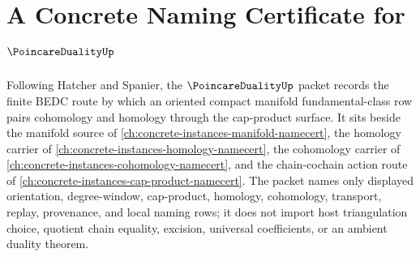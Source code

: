 \chapter{A Concrete Naming Certificate for $\PoincareDualityUp$}
\label{ch:concrete-instances-poincare-duality-namecert}

Following Hatcher and Spanier, the $\PoincareDualityUp$ packet records the finite BEDC route by which an oriented compact manifold fundamental-class row pairs cohomology and homology through the cap-product surface. It sits beside the manifold source of \autoref{ch:concrete-instances-manifold-namecert}, the homology carrier of \autoref{ch:concrete-instances-homology-namecert}, the cohomology carrier of \autoref{ch:concrete-instances-cohomology-namecert}, and the chain-cochain action route of \autoref{ch:concrete-instances-cap-product-namecert}. The packet names only displayed orientation, degree-window, cap-product, homology, cohomology, transport, replay, provenance, and local naming rows; it does not import host triangulation choice, quotient chain equality, excision, universal coefficients, or an ambient duality theorem.


